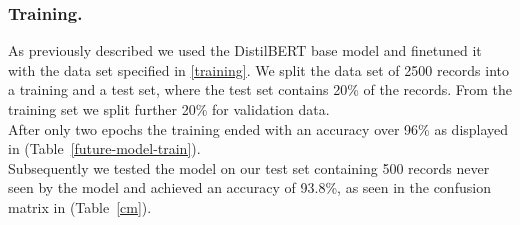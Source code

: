 \subsubsection{Training.}
As previously described we used the DistilBERT base model and finetuned it with the data set specified in \ref{training}.
We split the data set of 2500 records into a training and a test set, where the test set contains 20\% of the records.
From the training set we split further 20\% for validation data.
\\
After only two epochs the training ended with an accuracy over 96\% as displayed in (Table~\ref{future-model-train}).
\\
Subsequently we tested the model on our test set containing 500 records never seen by the model and achieved an accuracy of 93.8\%, as seen in the confusion matrix in (Table~\ref{cm}).

\begin{table}
\setlength\tabcolsep{2pt} %
\footnotesize\centering
\captionsetup{size=footnotesize}
\resizebox{\columnwidth}{!}{%
\begin{tabular}{
    ccccc}

\hline

\textbf{Epoch} & \textbf{Train Loss} & \textbf{Train Accuracy} & \textbf{Val. Loss} & \textbf{Val. Accuracy}\\
\hline
0 & 0.3816 & 0.8594 & 0.1547 & 0.9475 \\
1 & 0.1142 & 0.9613 & 0.1272 & 0.9625 \\
\hline
\end{tabular}}
\caption{\label{future-model-train}
Training Results
}
\end{table}

